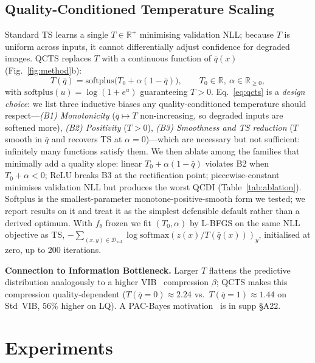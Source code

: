\documentclass{bmvc2k}
\newcommand{\qbar}{\bar{q}}
\newcommand{\R}{\mathbb{R}}
\newcommand{\D}{\mathcal{D}}
\begin{document}
\subsection{Quality-Conditioned Temperature Scaling}
\label{sec:qcts}

Standard TS learns a single $T\in\R^+$ minimising validation NLL; because $T$ is uniform across inputs, it cannot differentially adjust confidence for degraded images. QCTS replaces $T$ with a continuous function of $\qbar(x)$ (Fig.~\ref{fig:method}b):
\begin{equation}
T(\qbar) = \mathrm{softplus}\big(T_0 + \alpha (1 - \qbar)\big),\qquad T_0\in\R,\ \alpha\in\R_{\ge 0},
\label{eq:qcts}
\end{equation}
with $\mathrm{softplus}(u){=}\log(1{+}e^u)$ guaranteeing $T{>}0$. Eq.~\ref{eq:qcts} is a \emph{design choice}: we list three inductive biases any quality-conditioned temperature should respect---\emph{(B1) Monotonicity} ($\qbar\mapsto T$ non-increasing, so degraded inputs are softened more), \emph{(B2) Positivity} ($T{>}0$), \emph{(B3) Smoothness and TS reduction} ($T$ smooth in $\qbar$ and recovers TS at $\alpha{=}0$)---which are necessary but not sufficient: infinitely many functions satisfy them. We then ablate among the families that minimally add a quality slope: linear $T_0{+}\alpha(1{-}\qbar)$ violates B2 when $T_0{+}\alpha{<}0$; ReLU breaks B3 at the rectification point; piecewise-constant minimises validation NLL but produces the worst QCDI (Table~\ref{tab:ablation}). Softplus is the smallest-parameter monotone-positive-smooth form we tested; we report results on it and treat it as the simplest defensible default rather than a derived optimum. With $f_\theta$ frozen we fit $(T_0,\alpha)$ by L-BFGS on the same NLL objective as TS, $-\sum_{(x,y)\in\D_\text{val}}\log\mathrm{softmax}(z(x)/T(\qbar(x)))_y$, initialised at zero, up to 200 iterations.

\textbf{Connection to Information Bottleneck.}
Larger $T$ flattens the predictive distribution analogously to a higher VIB~\cite{alemi2017vib} compression $\beta$; QCTS makes this compression quality-dependent ($T(\qbar{=}0){\approx}2.24$ vs.\ $T(\qbar{=}1){\approx}1.44$ on Std~VIB, $56\%$ higher on LQ). A PAC-Bayes motivation~\cite{mcallester1999pac} is in supp \S A22.

\section{Experiments}
\label{sec:experiments}
\end{document}
